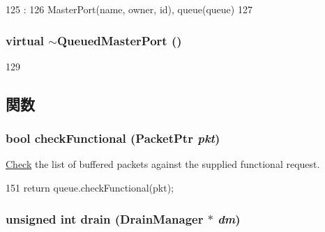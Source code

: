 \begin{DoxyCode}
125                                                                           :
126         MasterPort(name, owner, id), queue(queue)
127     { }

\end{DoxyCode}
\hypertarget{classQueuedMasterPort_aa4385651aa180db02c719e125fc63881}{
\subsubsection[{$\sim$QueuedMasterPort}]{\setlength{\rightskip}{0pt plus 5cm}virtual $\sim${\bf QueuedMasterPort} ()}}
\label{classQueuedMasterPort_aa4385651aa180db02c719e125fc63881}



\begin{DoxyCode}
129 { }
\end{DoxyCode}


\subsection{関数}
\hypertarget{classQueuedMasterPort_a8eb60d4744b6212ad749f3a586759266}{
\subsubsection[{checkFunctional}]{\setlength{\rightskip}{0pt plus 5cm}bool checkFunctional ({\bf PacketPtr} {\em pkt})}}
\label{classQueuedMasterPort_a8eb60d4744b6212ad749f3a586759266}
\hyperlink{classCheck}{Check} the list of buffered packets against the supplied functional request. 


\begin{DoxyCode}
151 { return queue.checkFunctional(pkt); }
\end{DoxyCode}
\hypertarget{classQueuedMasterPort_aa8a18d230dba7a674ac8a0b4f35bc36a}{
\subsubsection[{drain}]{\setlength{\rightskip}{0pt plus 5cm}unsigned int drain ({\bf DrainManager} $\ast$ {\em dm})}}
\label{classQueuedMasterPort_aa8a18d230dba7a674ac8a0b4f35bc36a}



